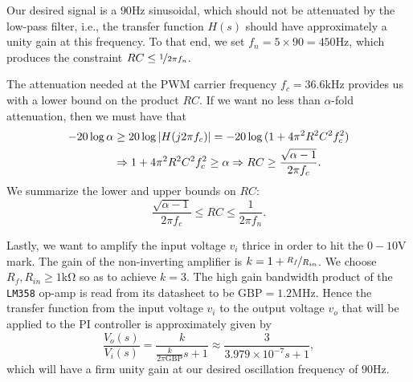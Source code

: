 Our desired signal is a $90$\unit{\hertz} sinusoidal, which should not be
attenuated by the low-pass filter, i.e., the transfer function $H(s)$ should
have approximately a unity gain at this frequency. To that end, we set $f_n = 5
\times 90 = 450$\unit{\hertz}, which produces the constraint $RC \leq
\nicefrac{1}{2\pi f_n}$.

The attenuation needed at the PWM carrier frequency $f_c =
36.6$\unit{\kilo\hertz} provides us with a lower bound on the product $RC$. 
If we want no less than $\alpha$-fold attenuation, then we must have that 
%
\begin{align*}
    -20 \log \alpha &\geq 20 \log{\left|{H(j2\pi f_c)}\right|} = -20 \log{(1+4\pi^2
    R^2C^2f_c^2)} \\ &\Rightarrow 1 + 4 \pi^2 R^2C^2f_c^2 \geq \alpha \Rightarrow
    RC \geq \frac{\sqrt{\alpha-1}}{2\pi f_c}.
\end{align*}
%
We summarize the lower and upper bounds on $RC$:
%
\begin{equation*}
    \frac{\sqrt{\alpha-1}}{2\pi f_c} \leq RC \leq \frac{1}{2\pi f_n}.
\end{equation*}


Lastly, we want to amplify the input voltage $v_i$ thrice in order to hit the
$0-10$\unit{\volt} mark. The gain of the non-inverting amplifier is $k = 1 +
\nicefrac{R_f}{R_{in}}$. We choose $R_f, R_{in} \geq 1$\unit{\kilo\ohm} so as to
achieve $k = 3$. The high gain bandwidth product of the \texttt{LM358} op-amp is
read from its datasheet to be $\text{GBP} = 1.2$\unit{\mega\hertz}. Hence the
transfer function from the input voltage $v_i$ to the output voltage $v_o$ that
will be applied to the PI controller is approximately given by \[
    \frac{V_o(s)}{V_i(s)} = \frac{k}{\frac{k}{2\pi\text{GBP}}s + 1} \approx
\frac{3}{3.979\times 10^{-7}s + 1}, \] which will have a firm unity gain at our
desired oscillation frequency of $90$\unit{\hertz}.


